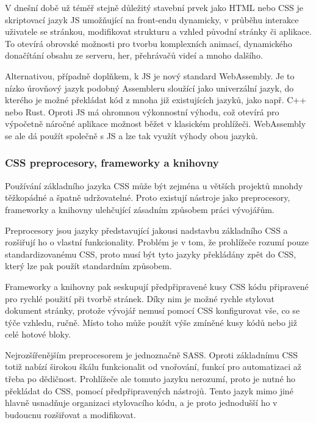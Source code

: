 		V dnešní době už téměř stejně důležitý stavební prvek jako \Ac{HTML} nebo \Ac{CSS} je skriptovací jazyk \ac{JS}
		umožňující na front-endu dynamicky, v průběhu interakce uživatele se stránkou, modifikovat strukturu a vzhled
		původní stránky či aplikace.
		To otevírá obrovské možnosti pro tvorbu komplexních animací, dynamického donačítání obsahu ze serveru, her, přehrávačů
		videí a mnoho dalšího. \cite{what_is_javascript}

		Alternativou, případně doplňkem, k \ac{JS} je nový standard WebAssembly.
		Je to nízko úrovňový jazyk podobný Assembleru sloužící jako univerzální jazyk, do kterého je možné překládat
		kód z mnoha již existujících jazyků, jako např. C++ nebo Rust.
		Oproti \ac{JS} má ohromnou výkonnostní výhodu, což otevírá pro výpočetně náročné aplikace možnost běžet
		v klasickém prohlížeči.
		WebAssembly se ale dá použít společně s \ac{JS} a lze tak využít výhody obou jazyků. \cite{webassembly}

		\subsubsection{CSS preprocesory, frameworky a knihovny}

		Používání základního jazyka \Ac{CSS} může být zejména u větších projektů mnohdy těžkopádné a špatně udržovatelné.
		Proto existují nástroje jako preprocesory, frameworky a knihovny ulehčující zásadním způsobem práci vývojářům.

		Preprocesory jsou jazyky představující jakousi nadstavbu základního \Ac{CSS} a rozšiřují ho o vlastní
		funkcionality.
		Problém je v tom, že prohlížeče rozumí pouze standardizovanému \Ac{CSS}, proto musí být tyto jazyky překládány
		zpět do \Ac{CSS}, který lze pak použít standardním způsobem.

		Frameworky a knihovny pak seskupují předpřipravené kusy \Ac{CSS} kódu připravené pro rychlé použití při tvorbě stránek.
		Díky nim je možné rychle stylovat dokument stránky, protože vývojář nemusí pomocí \Ac{CSS} konfigurovat vše, co se
		týče vzhledu, ručně.
		Místo toho může použít výše zmíněné kusy kódů nebo již celé hotové bloky.

		Nejrozšířenějším preprocesorem je jednoznačně \Ac{SASS}.
		Oproti základnímu \Ac{CSS} totiž nabízí širokou škálu funkcionalit od vnořování, funkcí pro automatizaci až třeba
		po dědičnost.
		Prohlížeče ale tomuto jazyku nerozumí, proto je nutné ho překládat do \Ac{CSS}, pomocí předpřipravených nástrojů.
		Tento jazyk mimo jiné hlavně usnadňuje organizaci stylovacího kódu, a je proto jednodušší ho v budoucnu rozšiřovat a
		modifikovat. \cite{learn_sass}

